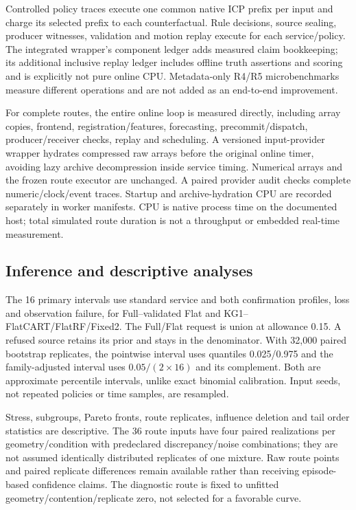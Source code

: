 Controlled policy traces execute one common native ICP prefix per input and charge its selected prefix to each counterfactual. Rule decisions, source sealing, producer witnesses, validation and motion replay execute for each service/policy. The integrated wrapper's component ledger adds measured claim bookkeeping; its additional inclusive replay ledger includes offline truth assertions and scoring and is explicitly not pure online CPU. Metadata-only R4/R5 microbenchmarks measure different operations and are not added as an end-to-end improvement.

For complete routes, the entire online loop is measured directly, including array copies, frontend, registration/features, forecasting, precommit/dispatch, producer/receiver checks, replay and scheduling. A versioned input-provider wrapper hydrates compressed raw arrays before the original online timer, avoiding lazy archive decompression inside service timing. Numerical arrays and the frozen route executor are unchanged. A paired provider audit checks complete numeric/clock/event traces. Startup and archive-hydration CPU are recorded separately in worker manifests. CPU is native process time on the documented host; total simulated route duration is not a throughput or embedded real-time measurement.

\subsection{Inference and descriptive analyses}
The 16 primary intervals use standard service and both confirmation profiles, loss and observation failure, for Full--validated Flat and KG1--FlatCART/FlatRF/Fixed2. The Full/Flat request is union at allowance 0.15. A refused source retains its prior and stays in the denominator. With 32,000 paired bootstrap replicates, the pointwise interval uses quantiles 0.025/0.975 and the family-adjusted interval uses $0.05/(2\times16)$ and its complement. Both are approximate percentile intervals, unlike exact binomial calibration. Input seeds, not repeated policies or time samples, are resampled.

Stress, subgroups, Pareto fronts, route replicates, influence deletion and tail order statistics are descriptive. The 36 route inputs have four paired realizations per geometry/condition with predeclared discrepancy/noise combinations; they are not assumed identically distributed replicates of one mixture. Raw route points and paired replicate differences remain available rather than receiving episode-based confidence claims. The diagnostic route is fixed to unfitted geometry/contention/replicate zero, not selected for a favorable curve.

